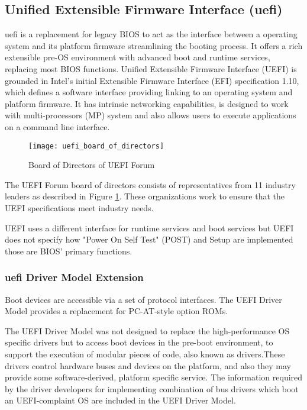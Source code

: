 \subsection{Unified Extensible Firmware Interface (\gls{uefi})}
\gls{uefi} is a replacement for legacy BIOS to act as the interface between a operating system and its platform firmware streamlining the booting process. It offers a rich extensible pre-OS environment with advanced boot and runtime services, replacing most BIOS functions. Unified Extensible Firmware Interface (UEFI) is grounded in Intel’s initial Extensible Firmware Interface (EFI) specification 1.10, which defines a software interface providing linking to an operating system and platform firmware. It has intrinsic networking capabilities,  is designed to work with multi-processors (MP) system and also allows users to execute applications on a command line interface.

\begin{figure}[h]
	\centering
	\texttt{[image: uefi\_board\_of\_directors]}
	\caption{Board of Directors of UEFI Forum}\label{fig:introduction-uefi-board-of-directors}
\end{figure}

The UEFI Forum board of directors consists of representatives from 11 industry leaders as described in Figure \ref{fig:introduction-uefi-board-of-directors}. These organizations work to ensure that the UEFI specifications meet industry needs.

UEFI uses a different interface for runtime services and boot services but UEFI does not specify how "Power On Self Test" (POST) and Setup are implemented those are BIOS’ primary functions.

\subsubsection{\gls{uefi} Driver Model Extension}
Boot devices are accessible via a set of protocol interfaces. The UEFI Driver Model provides a replacement for PC-AT-style option ROMs.

The UEFI Driver Model was not designed to replace the high-performance OS specific drivers but to access boot devices in the pre-boot environment, to support the execution of modular pieces of code, also known as drivers.These drivers control hardware buses and devices on the platform, and also they may provide some software-derived, platform specific service. The information required by the driver developers for implementing combination of bus drivers which boot an UEFI-complaint OS are included in the UEFI Driver Model.

